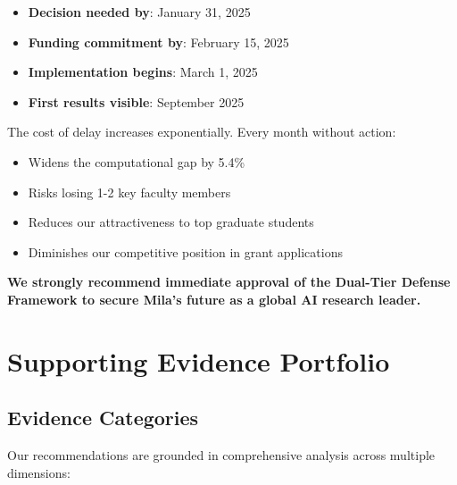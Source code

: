 \documentclass{article}
\begin{document}
\begin{itemize}
\item \textbf{Decision needed by}: January 31, 2025
\item \textbf{Funding commitment by}: February 15, 2025
\item \textbf{Implementation begins}: March 1, 2025
\item \textbf{First results visible}: September 2025
\end{itemize}

The cost of delay increases exponentially. Every month without action:
\begin{itemize}
\item Widens the computational gap by 5.4\%
\item Risks losing 1-2 key faculty members
\item Reduces our attractiveness to top graduate students
\item Diminishes our competitive position in grant applications
\end{itemize}

\textbf{We strongly recommend immediate approval of the Dual-Tier Defense Framework to secure Mila's future as a global AI research leader.}

\section{Supporting Evidence Portfolio}

\subsection{Evidence Categories}

Our recommendations are grounded in comprehensive analysis across multiple dimensions:
\end{document}
